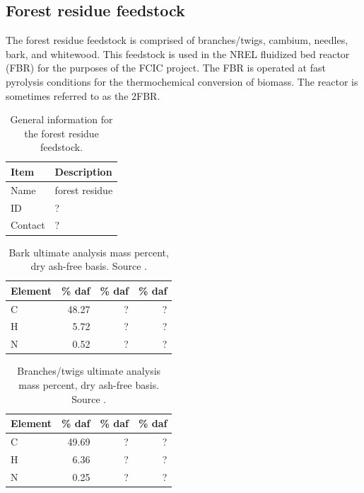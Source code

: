 \subsection{Forest residue feedstock}

The forest residue feedstock is comprised of branches/twigs, cambium, needles, bark, and whitewood. This feedstock is used in the NREL fluidized bed reactor (FBR) for the purposes of the FCIC project. The FBR is operated at fast pyrolysis conditions for the thermochemical conversion of biomass. The reactor is sometimes referred to as the 2FBR.

\begin{table}[H]
    \centering
    \caption{General information for the forest residue feedstock.}
    \begin{tabular}{ll}
        \toprule
        Item    & Description \\
        \midrule
        Name    & forest residue \\
        ID      & ? \\
        Contact & ? \\
        \bottomrule
    \end{tabular}
\end{table}

\begin{table}[H]
    \centering
    \caption{Bark ultimate analysis mass percent, dry ash-free basis. Source \cite{Unknown-2019}.}
    \begin{tabular}{lrrr}
        \toprule
        Element & \% daf & \% daf & \% daf \\
        \midrule
        C        & 48.27 & ? & ? \\
        H        & 5.72  & ? & ? \\
        N        & 0.52  & ? & ? \\
        \bottomrule
    \end{tabular}
\end{table}

\begin{table}[H]
    \centering
    \caption{Branches/twigs ultimate analysis mass percent, dry ash-free basis. Source \cite{Unknown-2019}.}
    \begin{tabular}{lrrr}
        \toprule
        Element & \% daf & \% daf & \% daf \\
        \midrule
        C        & 49.69 & ? & ? \\
        H        & 6.36  & ? & ? \\
        N        & 0.25  & ? & ? \\
        \bottomrule
    \end{tabular}
\end{table}

